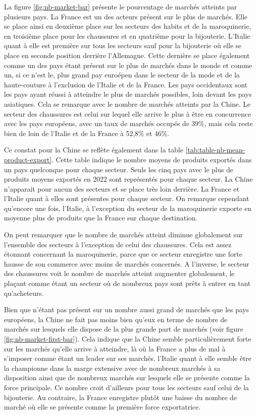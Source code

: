 \documentclass[french,10pt,a4paper]{article}
\begin{document}
La figure \ref{fig:nb-market-bar} présente le pourcentage de marchés atteints par plusieurs pays. La France est un des acteurs présent sur le plus de marchés. Elle se place ainsi en deuxième place sur les secteurs des habits et de la maroquinerie, en troisième place pour les chaussures et en quatrième pour la bijouterie. L'Italie quant à elle est première sur tous les secteurs sauf pour la bijouterie où elle se place en seconde position derrière l'Allemagne. Cette dernière se place également comme un des pays étant présent sur le plus de marchés dans le monde et comme un, si ce n'est le, plus grand pay euroépen dans le secteur de la mode et de la haute-couture à l'exclusion de l'Italie et de la France. Les pays occidentaux sont les pays ayant réussi à atteindre le plus de marchés possibles, loin devant les pays asiatiques. Cela se remarque avec le nombre de marchés atteints par la Chine. Le secteur des chaussures est celui sur lequel elle arrive le plus à être en concurrence avec les pays européens, avec un taux de marchés occupés de 39\%, mais cela reste bien de loin de l'Italie et de la France à 52,8\% et 46\%.

Ce constat pour la Chine se reflète également dans la table \ref{tab:table-nb-mean-product-export}. Cette table indique le nombre moyens de produits exportés dans un pays quelconque pour chaque secteur. Seuls les cinq pays avec le plus de produits moyens exportés en 2022 sont représentés pour chaque secteur. La Chine n'apparait pour aucun des secteurs et se place très loin derrière. La France et l'Italie quant à elles sont présentes pour chaque secteur. On remarque cependant qu'encore une fois, l'Italie, à l'exception du secteur de la maroquinerie exporte en moyenne plus de produits que la France sur chaque destination.

On peut remarquer que le nombre de marchés atteint diminue globalement sur l'ensemble des secteurs à l'exception de celui des chaussures. Cela est assez étonnant concernant la maroquinerie, parce que ce secteur enregistre une forte hausse de son commerce avec moins de marchés concernés. A l'inverse, le secteur des chaussures voit le nombre de marchés atteint augmenter globalement, le plaçant comme étant un secteur où de nombreux pays sont prêts à entrer en tant qu'acheteurs. 

Bien que n'étant pas présent sur un nombre aussi grand de marchés que les pays européens, la Chine ne fait pas moins bien qu'eux en terme de nombre de marchés sur lesquels elle dispose de la plus grande part de marchés (voir figure \ref{fig:nb-market-first-bar}). Cela indique que la Chine semble particulièrement forte sur les marchés qu'elle arrive à atteindre, là où la France a plus de mal à s'imposer comme étant un leader sur ses marchés. l'Italie quant à elle semble être la championne dans la marge extensive avec de nombreux marchés à sa disposition ainsi que de nombreux marchés sur lesquels elle se présente comme la force principale. Ce nombre croit d'ailleurs pour tous les secteurs sauf celui de la bijouterie. Au contraire, la France enregistre plutôt une baisse du nombre de marché où elle se présente comme la première force exportatrice.
\end{document}
